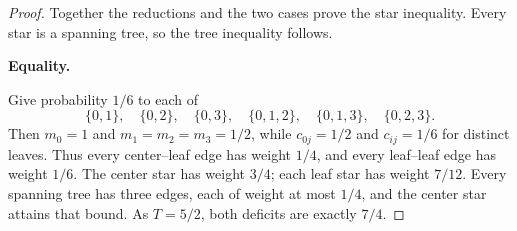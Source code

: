 \begin{proof}
Together the reductions and the two cases prove the star inequality.
Every star is a spanning tree, so the tree inequality follows.

\medskip\noindent\textbf{Equality.}

Give probability $1/6$ to each of
\[
 \{0,1\},\quad\{0,2\},\quad\{0,3\},\quad
 \{0,1,2\},\quad\{0,1,3\},\quad\{0,2,3\}.
\]
Then $m_0=1$ and $m_1=m_2=m_3=1/2$, while
$c_{0j}=1/2$ and $c_{ij}=1/6$ for distinct leaves.
Thus every center--leaf edge has weight $1/4$, and every
leaf--leaf edge has weight $1/6$.
The center star has weight $3/4$; each leaf star has weight
$7/12$.  Every spanning tree has three edges, each of weight
at most $1/4$, and the center star attains that bound.
As $T=5/2$, both deficits are exactly $7/4$.
\end{proof}


